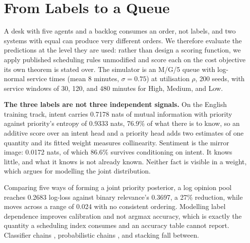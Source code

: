 \section{From Labels to a Queue}
\label{sec:queue}

A desk with five agents and a backlog consumes an order, not labels, and two
systems with equal \macrof{} can produce very different orders. We therefore
evaluate the predictions at the level they are used: rather than design a
scoring function, we apply published scheduling rules unmodified and score each
on the cost objective its own theorem is stated over. The simulator is an M/G/5
queue with log-normal service times (mean 8 minutes, $\sigma=0.75$) at
utilisation $\rho$, 200 seeds, with service windows of 30, 120, and 480 minutes
for High, Medium, and Low.

\textbf{The three labels are not three independent signals.} On the English
training track, intent carries 0.7178 nats of mutual information with priority
against priority's entropy of 0.9333 nats, 76.9\% of what there is to know, so
an additive score over an intent head and a priority head adds two estimates of
one quantity and its fitted weight measures collinearity. Sentiment is the
mirror image: 0.0172 nats, of which 86.6\% survives conditioning on intent. It
knows little, and what it knows is not already known. Neither fact is visible in
a weight, which argues for modelling the joint distribution.

Comparing five ways of forming a joint priority posterior, a log opinion pool
reaches 0.2683 log-loss against binary relevance's 0.3697, a 27\% reduction,
while \macrof{} moves across a range of 0.024 with no consistent ordering.
Modelling label dependence improves calibration and not argmax accuracy, which
is exactly the quantity a scheduling index consumes and an accuracy table cannot
report. Classifier chains \cite{read2009classifierchains}, probabilistic chains
\cite{dembczynski2010pcc}, and stacking \cite{wolpert1992stacked} fall between.

